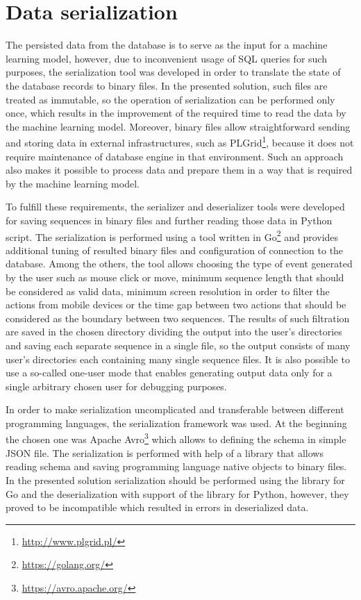 \section{Data serialization}\label{sec:data-serialization}
The persisted data from the database is to serve as the input for a machine learning model, however, due to inconvenient usage of SQL queries for such purposes, the serialization tool was developed in order to translate the state of the database records to binary files.
In the presented solution, such files are treated as immutable, so the operation of serialization can be performed only once, which results in the improvement of the required time to read the data by the machine learning model.
Moreover, binary files allow straightforward sending and storing data in external infrastructures, such as PLGrid\footnote{\url{http://www.plgrid.pl/}}, because it does not require maintenance of database engine in that environment.
Such an approach also makes it possible to process data and prepare them in a way that is required by the machine learning model.

To fulfill these requirements, the serializer and deserializer tools were developed for saving sequences in binary files and further reading those data in Python script.
The serialization is performed using a tool written in Go\footnote{\url{https://golang.org/}} and provides additional tuning of resulted binary files and configuration of connection to the database.
Among the others, the tool allows choosing the type of event generated by the user such as mouse click or move, minimum sequence length that should be considered as valid data, minimum screen resolution in order to filter the actions from mobile devices or the time gap between two actions that should be considered as the boundary between two sequences.
The results of such filtration are saved in the chosen directory dividing the output into the user's directories and saving each separate sequence in a single file, so the output consists of many user's directories each containing many single sequence files.
It is also possible to use a so-called one-user mode that enables generating output data only for a single arbitrary chosen user for debugging purposes.

In order to make serialization uncomplicated and transferable between different programming languages, the serialization framework was used.
At the beginning the chosen one was Apache Avro\footnote{\url{https://avro.apache.org/}} which allows to defining the schema in simple JSON file.
The serialization is performed with help of a library that allows reading schema and saving programming language native objects to binary files.
In the presented solution serialization should be performed using the library for Go and the deserialization with support of the library for Python, however, they proved to be incompatible which resulted in errors in deserialized data.

